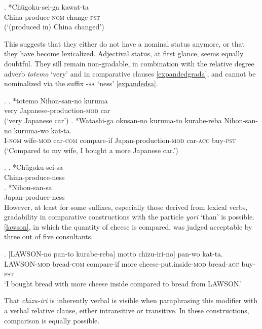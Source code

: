\documentclass [output=book,colorlinks,citecolor=brown]{langscibook}
\begin{document}
\exg. *Chūgoku-sei-ga kawat-ta\\
China-produce-\textsc{nom} change-\textsc{pst}\\
(`(produced in) China changed’)

This suggests that they either do not have a nominal status anymore, or that they have become lexicalized. Adjectival status, at first glance, seems equally doubtful. They sill remain non-gradable, in combination with the relative degree adverb \textit{totemo} `very’ and in comparative clauses \ref{expandedgrada}, and cannot be nominalized via the suffix -\textsc{sa} `ness’ \ref{expandedsa}. %

\ex. \label{expandedgrada} \ag. *totemo Nihon-san-no kuruma\\
very Japanese-production-\textsc{mod} car\\
(`very Japanese car’)
\bg. *Watashi-ga okusan-no kuruma-to kurabe-reba Nihon-san-no kuruma-wo kat-ta.\\
I-\textsc{nom} wife-\textsc{mod} car-\textsc{com} compare-if Japan-production-\textsc{mod} car-\textsc{acc} buy-\textsc{pst}\\
(`Compared to my wife, I bought a more Japanese car.’)

\ex. \label{expandedsa} \ag. *Chūgoku-sei-sa\\
China-produce-ness\\
\bg. *Nihon-san-sa\\
Japan-produce-ness\\

However, at least for some suffixes, especially those derived from lexical verbs, gradability in comparative constructions with the particle \textit{yori} `than’ is possible. \ref{lawson}, in which the quantity of cheese is compared, was judged acceptable by three out of five consultants.

\exg. [LAWSON-no pan-to kurabe-reba] motto chīzu-iri-no] pan-wo kat-ta.\\
LAWSON-\textsc{mod} bread-\textsc{com} compare-if more cheese-put.inside-\textsc{mod} bread-\textsc{acc} buy-\textsc{pst}\\
`I bought bread with more cheese inside compared to bread from LAWSON.’ \label{lawson}

That \textit{chīzu-iri} is inherently verbal is visible when paraphrasing this modifier with a verbal relative clause, either intransitive or transitive. In these constructions, comparison is equally possible.
\end{document}
